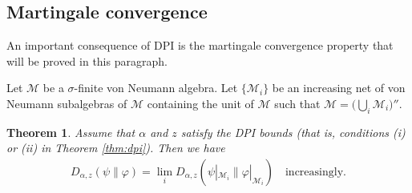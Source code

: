 \documentclass[12pt]{article}
\newtheorem{theorem}{Theorem}[section]
\theoremstyle{definition}
\theoremstyle{remark}
\numberwithin{equation}{section}
\def\cM{\mathcal M}
\def\ffi{\varphi}
\begin{document}
\subsection{Martingale convergence}

An important consequence of DPI is the martingale convergence property that will be
proved in this paragraph.





Let $\cM$ be a $\sigma$-finite von Neumann algebra. Let $\{\cM_i\}$ be an increasing net of von Neumann
subalgebras of $\cM$ containing the unit of $\cM$ such that $\cM=\bigl(\bigcup_i\cM_i\bigr)''$.

\begin{theorem}\label{thm:martingale}
Assume that $\alpha$ and $z$ satisfy the DPI bounds (that is, conditions (i) or (ii) in Theorem
\ref{thm:dpi}). Then we have
\begin{align}\label{eq:martingale}
D_{\alpha,z}(\psi\|\ffi)=\lim_iD_{\alpha,z}(\psi|_{\cM_i}\|\ffi|_{\cM_i})
\quad\mbox{increasingly}.
\end{align}
\end{theorem}
\end{document}
